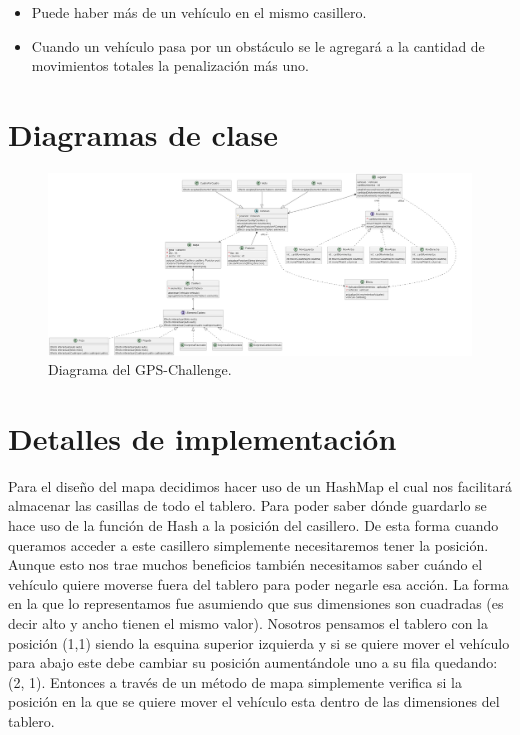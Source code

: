 \documentclass[titlepage,a4paper]{article}
\begin{document}
    \begin{itemize}
        \item Puede haber más de un vehículo en el mismo casillero.
        \item Cuando un vehículo pasa por un obstáculo se le agregará a la cantidad de movimientos totales la penalización más uno.
    \end{itemize}


    \section{Diagramas de clase}\label{sec:diagramasdeclase}


    \begin{figure}[H]
        \centering
        \includegraphics[width=1\textwidth]{diagrama de clase.png}
        \caption{\label{fig:class01}Diagrama del GPS-Challenge.}
    \end{figure}

    \section{Detalles de implementación}\label{sec:implementacion}
    Para el diseño del mapa decidimos hacer uso de un HashMap el cual nos facilitará almacenar las casillas de todo el tablero. Para poder saber dónde guardarlo se hace uso de la función de Hash a la posición del casillero. De esta forma cuando queramos acceder a este casillero simplemente necesitaremos tener la posición.
    Aunque esto nos trae muchos beneficios también necesitamos saber cuándo el vehículo quiere moverse fuera del tablero para poder negarle esa acción. La forma en la que lo representamos fue asumiendo que sus dimensiones son cuadradas (es decir alto y ancho tienen el mismo valor). Nosotros pensamos el tablero con la posición (1,1) siendo la esquina superior izquierda y si se quiere mover el vehículo para abajo este debe cambiar su posición aumentándole uno a su fila quedando: (2, 1). Entonces a través de un método de mapa simplemente verifica si la posición en la que se quiere mover el vehículo esta dentro de las dimensiones del tablero.
\end{document}
